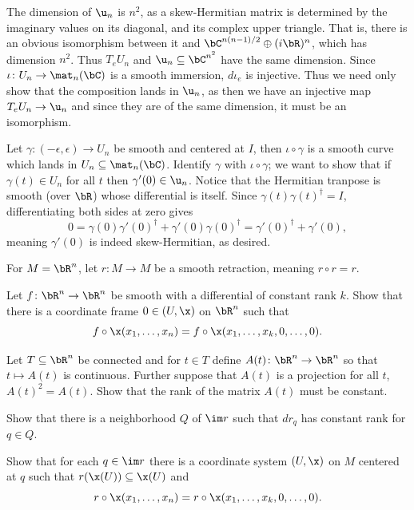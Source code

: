     \item The dimension of $\u_n$ is $n^2$, as a skew-Hermitian matrix is determined by the imaginary values on its diagonal, and its complex upper triangle.
    That is, there is an obvious isomorphism between it and $\bC^{n(n-1)/2}\oplus(i\bR)^n$, which has dimension $n^2$.
    Thus $T_eU_n$ and $\u_n\subseteq\bC^{n^2}$ have the same dimension.
    Since $\iota\colon U_n\to\mat_n(\bC)$ is a smooth immersion, $d\iota_e$ is injective.
    Thus we need only show that the composition lands in $\u_n$, as then we have an injective map $T_eU_n\to\u_n$ and since they are of the same dimension, it must be an isomorphism.

    Let $\gamma\colon(-\epsilon,\epsilon)\to U_n$ be smooth and centered at $I$, then $\iota\circ\gamma$ is a smooth curve which lands in $U_n\subseteq\mat_n(\bC)$.
    Identify $\gamma$ with $\iota\circ\gamma$; we want to show that if $\gamma(t)\in U_n$ for all $t$ then $\gamma'(0)\in\u_n$.
    Notice that the Hermitian tranpose is smooth (over $\bR$) whose differential is itself.
    Since $\gamma(t)\gamma(t)^\dagger=I$, differentiating both sides at zero gives
    $$ 0 = \gamma(0)\gamma'(0)^\dagger + \gamma'(0)\gamma(0)^\dagger = \gamma'(0)^\dagger + \gamma'(0) , $$
    meaning $\gamma'(0)$ is indeed skew-Hermitian, as desired.
\eenum

\bprob

    For $M=\bR^n$, let $r\colon M\to M$ be a smooth retraction, meaning $r\circ r=r$.
    \benum
        \item Let $f\colon\bR^n\to\bR^n$ be smooth with a differential of constant rank $k$.
        Show that there is a coordinate frame $0\in(U,\x)$ on $\bR^n$ such that
        $$ f\circ\x(x_1,\dots,x_n) = f\circ\x(x_1,\dots,x_k,0,\dots,0) . $$

        \item Let $T\subseteq\bR^n$ be connected and for $t\in T$ define $A(t)\colon\bR^n\to\bR^n$ so that $t\mapsto A(t)$ is continuous.
        Further suppose that $A(t)$ is a projection for all $t$, $A(t)^2=A(t)$.
        Show that the rank of the matrix $A(t)$ must be constant.

        \item Show that there is a neighborhood $Q$ of $\im r$ such that $dr_q$ has constant rank for $q\in Q$.

        \item Show that for each $q\in\im r$ there is a coordinate system $(U,\x)$ on $M$ centered at $q$ such that $r(\x(U))\subseteq\x(U)$ and
        $$ r\circ\x(x_1,\dots,x_n) = r\circ\x(x_1,\dots,x_k,0,\dots,0) . $$

